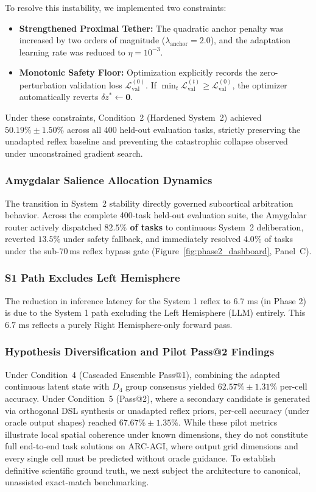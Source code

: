 \documentclass[11pt,a4paper]{article}
\theoremstyle{plain}
\theoremstyle{definition}
\theoremstyle{remark}
\begin{document}
To resolve this instability, we implemented two constraints:
\begin{itemize}
    \item \textbf{Strengthened Proximal Tether:} The quadratic anchor penalty was increased by two orders of magnitude ($\lambda_{\mathrm{anchor}} = 2.0$), and the adaptation learning rate was reduced to $\eta = 10^{-3}$.
    \item \textbf{Monotonic Safety Floor:} Optimization explicitly records the zero-perturbation validation loss $\mathcal{L}_{\mathrm{val}}^{(0)}$. If $\min_t \mathcal{L}_{\mathrm{val}}^{(t)} \ge \mathcal{L}_{\mathrm{val}}^{(0)}$, the optimizer automatically reverts $\delta z^* \leftarrow \mathbf{0}$.
\end{itemize}
Under these constraints, Condition~2 (Hardened System~2) achieved $50.19\% \pm 1.50\%$ across all 400 held-out evaluation tasks, strictly preserving the unadapted reflex baseline and preventing the catastrophic collapse observed under unconstrained gradient search.

\subsubsection{Amygdalar Salience Allocation Dynamics}

The transition in System~2 stability directly governed subcortical arbitration behavior. Across the complete 400-task held-out evaluation suite, the Amygdalar router actively dispatched \textbf{$82.5\%$ of tasks} to continuous System~2 deliberation, reverted $13.5\%$ under safety fallback, and immediately resolved $4.0\%$ of tasks under the sub-70\,ms reflex bypass gate (Figure~\ref{fig:phase2_dashboard}, Panel~C).

\subsubsection{S1 Path Excludes Left Hemisphere}
The reduction in inference latency for the System 1 reflex to $6.7$ ms (in Phase 2) is due to the System 1 path excluding the Left Hemisphere (LLM) entirely. This $6.7$ ms reflects a purely Right Hemisphere-only forward pass.

\subsubsection{Hypothesis Diversification and Pilot Pass@2 Findings}

Under Condition~4 (Cascaded Ensemble Pass@1), combining the adapted continuous latent state with $D_4$ group consensus yielded $62.57\% \pm 1.31\%$ per-cell accuracy. Under Condition~5 (Pass@2), where a secondary candidate is generated via orthogonal DSL synthesis or unadapted reflex priors, per-cell accuracy (under oracle output shapes) reached $67.67\% \pm 1.35\%$. While these pilot metrics illustrate local spatial coherence under known dimensions, they do not constitute full end-to-end task solutions on ARC-AGI, where output grid dimensions and every single cell must be predicted without oracle guidance. To establish definitive scientific ground truth, we next subject the architecture to canonical, unassisted exact-match benchmarking.
\end{document}
